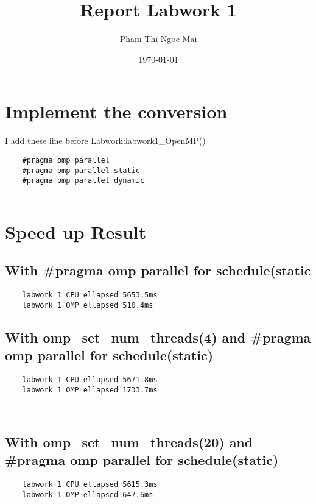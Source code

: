 \documentclass{article}
\title{Report Labwork 1}
\author{Pham Thi Ngoc Mai}
\date{\today}
\begin{document}
\maketitle

\section{Implement the conversion}
I add these line before Labwork:labwork1\_OpenMP()
\begin{verbatim}
    #pragma omp parallel
    #pragma omp parallel static
    #pragma omp parallel dynamic
    
\end{verbatim}


\section{Speed up Result}
\subsection{With \#pragma omp parallel for schedule(static}
\begin{verbatim}
    labwork 1 CPU ellapsed 5653.5ms
    labwork 1 OMP ellapsed 510.4ms
\end{verbatim}

\subsection{With omp\_set\_num\_threads(4) and \#pragma omp parallel for schedule(static)}
\begin{verbatim}
    labwork 1 CPU ellapsed 5671.8ms
    labwork 1 OMP ellapsed 1733.7ms

    
\end{verbatim}
\subsection{With omp\_set\_num\_threads(20) and \#pragma omp parallel for schedule(static)}
\begin{verbatim}
    labwork 1 CPU ellapsed 5615.3ms
    labwork 1 OMP ellapsed 647.6ms
\end{verbatim}
\end{document}
